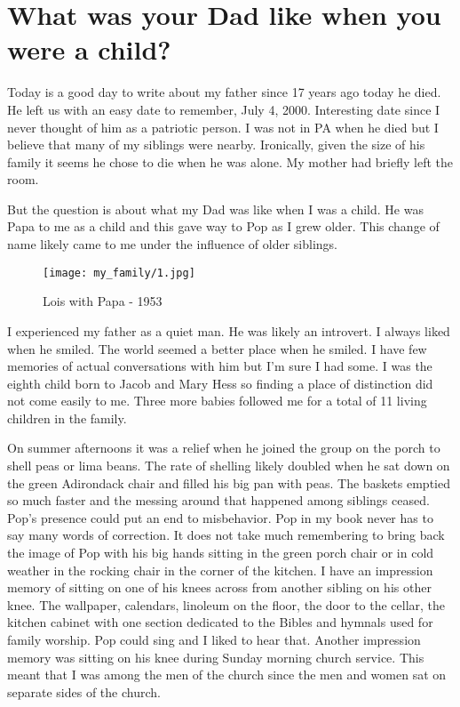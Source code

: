\section{What was your Dad like when you were a child?}

Today is a good day to write about my father since 17 years ago today he died.
He left us with an easy date to remember, July 4, 2000.
Interesting date since I never thought of him as a patriotic person.
I was not in PA when he died but I believe that many of my siblings were nearby.
Ironically, given the size of his family it seems he chose to die when he was alone.
My mother had briefly left the room.

But the question is about what my Dad was like when I was a child.
He was Papa to me as a child and this gave way to Pop as I grew older.
This change of name likely came to me under the influence of older siblings.

\begin{wrapfigure}{R}{0.85\textwidth}
\centering
\texttt{[image: my\_family/1.jpg]}
\caption{Lois with Papa - 1953}
\end{wrapfigure}
I experienced my father as a quiet man.
He was likely an introvert.
I always liked when he smiled.
The world seemed a better place when he smiled.
I have few memories of actual conversations with him but I'm sure I had some.
I was the eighth child born to Jacob and Mary Hess so finding a place of distinction did not come easily to me.
Three more babies followed me for a total of 11 living children in the family.

On summer afternoons it was a relief when he joined the group on the porch to shell peas or lima beans.
The rate of shelling likely doubled when he sat down on the green Adirondack chair and filled his big pan with peas.
The baskets emptied so much faster and the messing around that happened among siblings ceased.
Pop's presence could put an end to misbehavior.
Pop in my book never has to say many words of correction.
It does not take much remembering to bring back the image of Pop with his big hands sitting in the green porch chair or in cold weather in the rocking chair in the corner of the kitchen.
I have an impression memory of sitting on one of his knees across from another sibling on his other knee.
The wallpaper, calendars, linoleum on the floor, the door to the cellar, the kitchen cabinet with one section dedicated to the Bibles and hymnals used for family worship.
Pop could sing and I liked to hear that.
Another impression memory was sitting on his knee during Sunday morning church service.
This meant that I was among the men of the church since the men and women sat on separate sides of the church.

